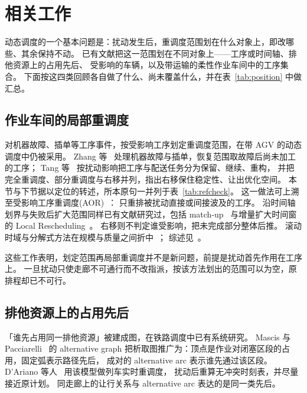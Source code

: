 \section{相关工作}
\label{sec:related_work}


动态调度的一个基本问题是：扰动发生后，重调度范围划在什么对象上，即改哪些、其余保持不动。
已有文献把这一范围划在不同对象上——工序或时间轴、排他资源上的占用先后、
受影响的车辆，以及带运输的柔性作业车间中的工序集合。
下面按这四类回顾各自做了什么、尚未覆盖什么，并在表~\ref{tab:position} 中做汇总。

\subsection{作业车间的局部重调度}
\label{sec:rw_aor}

对机器故障、插单等工序事件，按受影响工序划定重调度范围，在带 AGV 的动态调度中仍被采用。
Zhang 等~\cite{zhang2023energy} 处理机器故障与插单，恢复范围取故障后尚未加工的工序；
Tang 等~\cite{tang2026dynamic} 按扰动影响把工序与配送任务分为保留、继续、重构，
并把完全重调度、部分重调度与右移并列，指出右移保住稳定性、让出优化空间。
本节与下节据以定位的转述，所本原句一并列于表~\ref{tab:refcheck}。
这一做法可上溯至受影响工序重调度(AOR)~\cite{abumaizar1997rescheduling,subramaniam2003maor}：
只重排被扰动直接或间接波及的工序。
沿时间轴划界与失败后扩大范围同样已有文献研究过，包括 match-up~\cite{akturk1999matchup}
与增量扩大时间窗的 Local Rescheduling~\cite{kuster2007local}。
右移则不判定谁受影响，把未完成部分整体后推。
滚动时域与分解式方法在规模与质量之间折中~\cite{zeitrag2025novel,zhao2019decomposition}；
综述见~\cite{vieira2003rescheduling,ouelhadj2009survey}。

这些工作表明，划定范围再局部重调度并不是新问题，前提是扰动首先作用在工序上。
一旦扰动只使走廊不可通行而不改指派，按该方法划出的范围可以为空，原排程却已不可行。

\subsection{排他资源上的占用先后}
\label{sec:rw_ag}

「谁先占用同一排他资源」被建成图，在铁路调度中已有系统研究。
Mascis 与 Pacciarelli~\cite{mascis2002alternative} 的 alternative graph
把析取图推广为：顶点是作业对闭塞区段的占用，固定弧表示路径先后，
成对的 alternative arc 表示谁先通过该区段。
D'Ariano 等人~\cite{dariano2007branch} 用该模型做列车实时重调度，
扰动后重算无冲突时刻表，并尽量接近原计划。
同走廊上的让行关系与 alternative arc 表达的是同一类先后。


